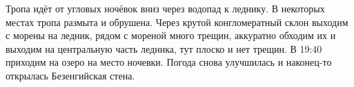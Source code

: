 Тропа идёт от угловых ночёвок вниз через водопад к леднику. В некоторых местах тропа размыта и обрушена. Через крутой конгломератный склон выходим с морены на ледник, рядом с мореной много трещин, аккуратно обходим их и выходим на центральную часть ледника, тут плоско и нет трещин. В 19:40 приходим на озеро на место ночевки. Погода снова улучшилась и наконец-то открылась Безенгийская стена.












    \FloatBarrier

